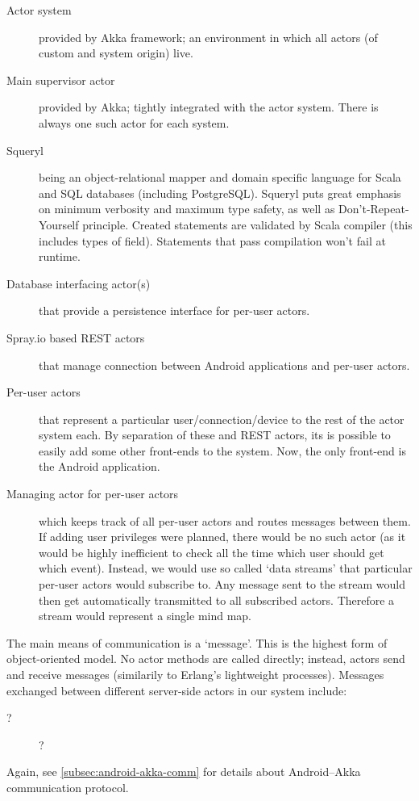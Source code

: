\begin{description}
	\item[Actor system]{provided by Akka framework; an environment in which all actors (of custom and system origin) live.}
	\item[Main supervisor actor]{provided by Akka; tightly integrated with the actor system. There is always one such actor for each system.}
	\item[Squeryl]{being an object-relational mapper and domain specific language for Scala and SQL databases (including PostgreSQL). Squeryl puts great emphasis on minimum verbosity and maximum type safety, as well as Don't-Repeat-Yourself principle. Created statements are validated by Scala compiler (this includes types of field). Statements that pass compilation won't fail at runtime. \cite{Squeryl:Intro}}
	\item[Database interfacing actor(s)]{that provide a persistence interface for per-user actors.}
	\item[Spray.io based REST actors]{that manage connection between Android applications and per-user actors.}
	\item[Per-user actors]{that represent a particular user/connection/device to the rest of the actor system each. By separation of these and REST actors, its is possible to easily add some other front-ends to the system. Now, the only front-end is the Android application.}
	\item[Managing actor for per-user actors]{which keeps track of all per-user actors and routes messages between them. If adding user privileges were planned, there would be no such actor (as it would be highly inefficient to check all the time which user should get which event). Instead, we would use so called `data streams' that particular per-user actors would subscribe to. Any message sent to the stream would then get automatically transmitted to all subscribed actors. Therefore a stream would represent a single mind map.}
\end{description}

The main means of communication is a `message'. This is the highest form of object-oriented model. No actor methods are called directly; instead, actors send and receive messages (similarily to Erlang's lightweight processes). Messages exchanged between different server-side actors in our system include:


\begin{description}
	\item[?]{?}
\end{description}

Again, see \cref{subsec:android-akka-comm} for details about Android--Akka communication protocol.